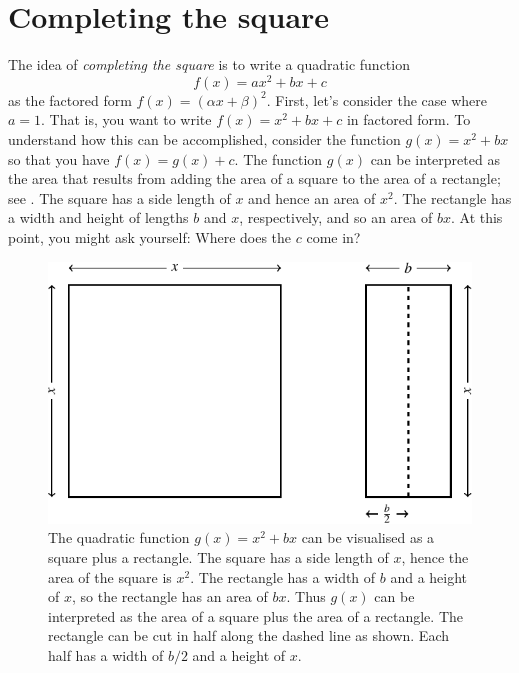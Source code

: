 \documentclass[a4paper,oneside,12pt]{article}
\begin{document}

\section{Completing the square}

The idea of \emph{completing the square} is to write a quadratic
function
\[
f(x)
=
ax^2 + bx + c
\]
as the factored form $f(x) = (\alpha x + \beta)^2$.  First, let's
consider the case where $a = 1$.  That is, you want to write
$f(x) = x^2 + bx + c$ in factored form.  To understand how this can be
accomplished, consider the function $g(x) = x^2 + bx$ so that you have
$f(x) = g(x) + c$.  The function $g(x)$ can be interpreted as the area
that results from adding the area of a square to the area of a
rectangle; see
.  The
square has a side length of $x$ and hence an area of $x^2$.  The
rectangle has a width and height of lengths $b$ and $x$, respectively,
and so an area of $bx$.  At this point, you might ask yourself:  Where
does the $c$ come in?

\begin{figure}[!htbp]
\centering
\includegraphics[scale=1.1]{image/10/complete-square-a1-c0.pdf}
\caption{%
  The quadratic function $g(x) = x^2 + bx$ can be visualised as a
  square plus a rectangle.  The square has a side length of $x$, hence
  the area of the square is $x^2$.  The rectangle has a width of $b$
  and a height of $x$, so the rectangle has an area of $bx$.  Thus
  $g(x)$ can be interpreted as the area of a square plus the area of a
  rectangle.  The rectangle can be cut in half along the dashed line
  as shown.  Each half has a width of $b/2$ and a height of $x$.
}
\label{fig:special_complete_square_square_plus_rectangle}
\end{figure}
\end{document}
